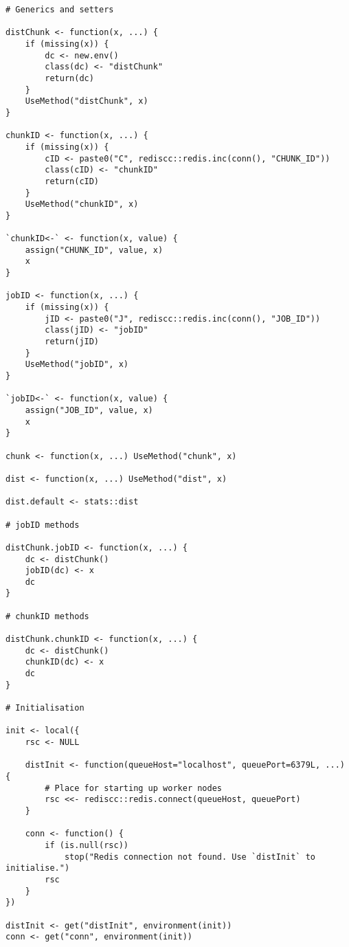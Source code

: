 \hypertarget{lst:wo-ass-shared}{%
\label{lst:wo-ass-shared}}%
\begin{verbatim}
# Generics and setters

distChunk <- function(x, ...) {
    if (missing(x)) {
        dc <- new.env()
        class(dc) <- "distChunk"
        return(dc)
    }
    UseMethod("distChunk", x)
}

chunkID <- function(x, ...) {
    if (missing(x)) {
        cID <- paste0("C", rediscc::redis.inc(conn(), "CHUNK_ID"))
        class(cID) <- "chunkID"
        return(cID)
    }
    UseMethod("chunkID", x)
}

`chunkID<-` <- function(x, value) {
    assign("CHUNK_ID", value, x)
    x
}

jobID <- function(x, ...) {
    if (missing(x)) {
        jID <- paste0("J", rediscc::redis.inc(conn(), "JOB_ID"))
        class(jID) <- "jobID"
        return(jID)
    }
    UseMethod("jobID", x)
}

`jobID<-` <- function(x, value) {
    assign("JOB_ID", value, x)
    x
}

chunk <- function(x, ...) UseMethod("chunk", x)

dist <- function(x, ...) UseMethod("dist", x)

dist.default <- stats::dist

# jobID methods

distChunk.jobID <- function(x, ...) {
    dc <- distChunk()
    jobID(dc) <- x
    dc
}

# chunkID methods

distChunk.chunkID <- function(x, ...) {
    dc <- distChunk()
    chunkID(dc) <- x
    dc
}

# Initialisation

init <- local({
    rsc <- NULL

    distInit <- function(queueHost="localhost", queuePort=6379L, ...) {
        # Place for starting up worker nodes
        rsc <<- rediscc::redis.connect(queueHost, queuePort)
    }

    conn <- function() {
        if (is.null(rsc))
            stop("Redis connection not found. Use `distInit` to initialise.")
        rsc
    }
})

distInit <- get("distInit", environment(init))
conn <- get("conn", environment(init))
\end{verbatim}

